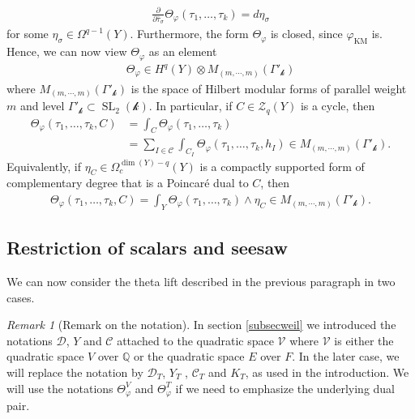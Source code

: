 \documentclass[11pt]{article} %
\newcommand{\8}{\infty}
\newcommand{\kbf}{\mathcal{k}}
\newcommand{\SL}{\operatorname{SL}}
\newcommand{\KM}{\operatorname{KM}}
\newcommand{\D}{\mathcal{D}}
\newcommand{\Q}{\mathbb{Q}}
\newcommand{\Vcal}{\mathcal{V}}
\newcommand{\Ccal}{\mathcal{C}}
\newcommand{\Zcal}{\mathcal{Z}}
\theoremstyle{mytheoremstyle}
\theoremstyle{remark}
\newtheorem{rmk}{Remark}[section]
\numberwithin{equation}{section}
\begin{document}
\begin{align}
 \frac{\partial}{\partial \bar{\tau}_\sigma}\Theta_\varphi(\tau_1, \dots, \tau_k)=d \eta_\sigma   
\end{align}
for some $\eta_\sigma \in \Omega^{q-1}(Y)$. Furthermore, the form $\Theta_\varphi$ is closed, since $\varphi_{\KM}$ is. Hence, we can now view $\Theta_\varphi$ as an element 
\begin{align}
    \Theta_\varphi \in H^q(Y) \otimes M_{(m, \cdots ,m)}(\Gamma'_\kbf )
\end{align}
where $M_{(m, \cdots ,m)}(\Gamma'_\kbf )$ is the space of Hilbert modular forms of parallel weight $m$ and level $\Gamma'_\kbf \subset \SL_2(\kbf)$.
In particular, if $C \in \Zcal_q(Y)$ is a cycle, then 
\begin{align} \label{kmlift1}
    \Theta_\varphi(\tau_1, \dots, \tau_k,C) & = \int_{C} \Theta_\varphi(\tau_1, \dots, \tau_k) \nonumber \\
   & = \sum_{I \in \Ccal}\int_{C_I} \Theta_\varphi(\tau_1, \dots, \tau_k,h_I) \in M_{(m, \cdots ,m)}(\Gamma'_\kbf ).
\end{align}
Equivalently, if $\eta_C \in \Omega_c^{\dim(Y)-q}(Y)$ is a compactly supported form of complementary degree that is a Poincaré dual to $C$, then 
\begin{align} 
    \Theta_\varphi(\tau_1, \dots, \tau_k,C) = \int_{Y} \Theta_\varphi(\tau_1, \dots, \tau_k) \wedge \eta_C \in M_{(m, \cdots ,m)}(\Gamma'_\kbf ).
\end{align}
\subsection{Restriction of scalars and seesaw} 
 We can now consider the theta lift described in the previous paragraph in two cases.
 
 \begin{rmk}[Remark on the notation] In section \ref{subsecweil} we introduced  the notations $\D$, $Y$ and $\Ccal$ attached to the quadratic space $\Vcal$ where $\Vcal$ is either the quadratic space $V$ over $\Q$ or the quadratic space $E$ over $F$. In the later case, we will replace the notation by $\D_T$, $Y_T$ , $\Ccal_T$ and $K_T$, as used in the introduction. { We will use the notations $\Theta_\varphi^V$ and $\Theta_\varphi^T$ if we need to emphasize the underlying dual pair.}
\end{rmk}
\end{document}
